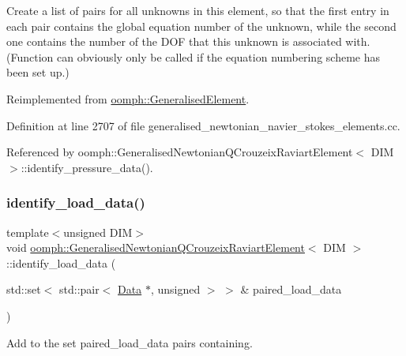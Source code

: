 Create a list of pairs for all unknowns in this element, so that the first entry in each pair contains the global equation number of the unknown, while the second one contains the number of the D\+OF that this unknown is associated with. (Function can obviously only be called if the equation numbering scheme has been set up.) 

Reimplemented from \hyperlink{classoomph_1_1GeneralisedElement_a069f59bfc3e607a5bebba52c6314d777}{oomph\+::\+Generalised\+Element}.



Definition at line 2707 of file generalised\+\_\+newtonian\+\_\+navier\+\_\+stokes\+\_\+elements.\+cc.



Referenced by oomph\+::\+Generalised\+Newtonian\+Q\+Crouzeix\+Raviart\+Element$<$ D\+I\+M $>$\+::identify\+\_\+pressure\+\_\+data().

\mbox{\label{classoomph_1_1GeneralisedNewtonianQCrouzeixRaviartElement_a49a4adf55b10a9aab75f864597e892cd}} 
\subsubsection{\texorpdfstring{identify\+\_\+load\+\_\+data()}{identify\_load\_data()}}
{\footnotesize\ttfamily template$<$unsigned D\+IM$>$ \\
void \hyperlink{classoomph_1_1GeneralisedNewtonianQCrouzeixRaviartElement}{oomph\+::\+Generalised\+Newtonian\+Q\+Crouzeix\+Raviart\+Element}$<$ D\+IM $>$\+::identify\+\_\+load\+\_\+data (\begin{DoxyParamCaption}\item[{std\+::set$<$ std\+::pair$<$ \hyperlink{classoomph_1_1Data}{Data} $\ast$, unsigned $>$ $>$ \&}]{paired\+\_\+load\+\_\+data }\end{DoxyParamCaption})\hspace{0.3cm}{\ttfamily [virtual]}}



Add to the set {\ttfamily paired\+\_\+load\+\_\+data} pairs containing. 


